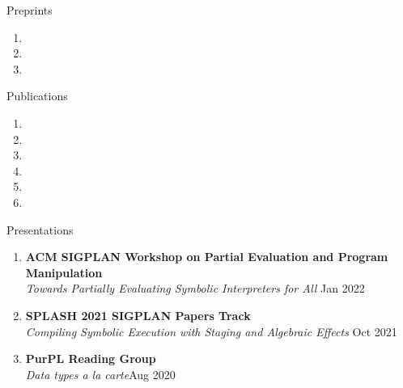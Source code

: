 \documentclass{resume} %
\begin{document}




\begin{rSection}{Preprints}
    \begin{enumerate}
        \item {}
        \item {}
        \item {}
    \end{enumerate}
\end{rSection}

\begin{rSection}{Publications}
\begin{enumerate}
    \item {}
    \item {}
    \item {}
    \item {}
    \item {}
    \item {}
\end{enumerate}

        

\end{rSection}

\begin{rSection}{Presentations}
\begin{enumerate}
\item \textbf{ACM SIGPLAN Workshop on Partial Evaluation and Program Manipulation}\\
\textit{Towards Partially Evaluating Symbolic Interpreters for All} \hfill Jan 2022
\item \textbf{SPLASH 2021 SIGPLAN Papers Track}\\
\textit{Compiling Symbolic Execution with Staging and Algebraic Effects} \hfill Oct 2021
\item \textbf{PurPL Reading Group} \\
\textit{Data types a la carte}\hfill Aug 2020
\end{enumerate}
\end{rSection}
\end{document}
